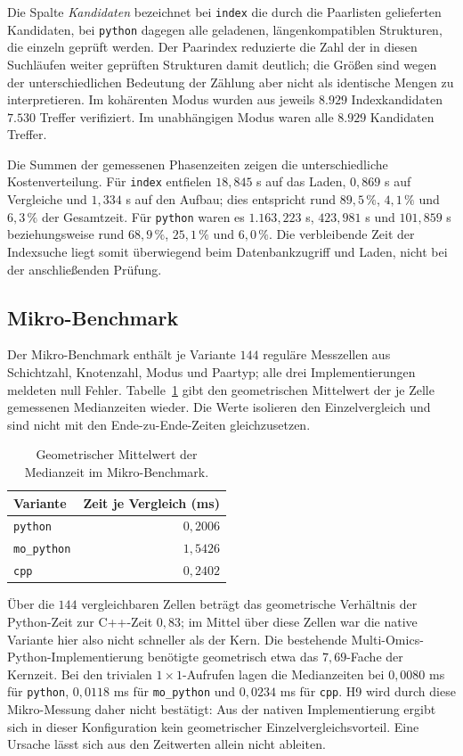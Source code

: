 \documentclass[a4paper,12pt, twoside]{report}
\theoremstyle{definition}
\begin{document}
Die Spalte \emph{Kandidaten} bezeichnet bei \texttt{index} die durch die Paarlisten gelieferten Kandidaten, bei \texttt{python} dagegen alle geladenen, längenkompatiblen Strukturen, die einzeln geprüft werden. Der Paarindex reduzierte die Zahl der in diesen Suchläufen weiter geprüften Strukturen damit deutlich; die Größen sind wegen der unterschiedlichen Bedeutung der Zählung aber nicht als identische Mengen zu interpretieren. Im kohärenten Modus wurden aus jeweils $8.929$ Indexkandidaten $7.530$ Treffer verifiziert. Im unabhängigen Modus waren alle $8.929$ Kandidaten Treffer.

Die Summen der gemessenen Phasenzeiten zeigen die unterschiedliche Kostenverteilung. Für \texttt{index} entfielen $18{,}845$ s auf das Laden, $0{,}869$ s auf Vergleiche und $1{,}334$ s auf den Aufbau; dies entspricht rund $89{,}5\,\%$, $4{,}1\,\%$ und $6{,}3\,\%$ der Gesamtzeit. Für \texttt{python} waren es $1.163{,}223$ s, $423{,}981$ s und $101{,}859$ s beziehungsweise rund $68{,}9\,\%$, $25{,}1\,\%$ und $6{,}0\,\%$. Die verbleibende Zeit der Indexsuche liegt somit überwiegend beim Datenbankzugriff und Laden, nicht bei der anschließenden Prüfung.

\subsection{Mikro-Benchmark}

Der Mikro-Benchmark enthält je Variante $144$ reguläre Messzellen aus Schichtzahl, Knotenzahl, Modus und Paartyp; alle drei Implementierungen meldeten null Fehler. Tabelle~\ref{tab:ucx_micro_results} gibt den geometrischen Mittelwert der je Zelle gemessenen Medianzeiten wieder. Die Werte isolieren den Einzelvergleich und sind nicht mit den Ende-zu-Ende-Zeiten gleichzusetzen.

\begin{table}[!ht]
	\centering
	\small
	\caption{Geometrischer Mittelwert der Medianzeit im Mikro-Benchmark.}
	\label{tab:ucx_micro_results}
	\begin{tabular}{lr}
		\toprule
		Variante & Zeit je Vergleich (ms) \\
		\midrule
		\texttt{python} & $0{,}2006$ \\
		\texttt{mo\_python} & $1{,}5426$ \\
		\texttt{cpp} & $0{,}2402$ \\
		\bottomrule
	\end{tabular}
\end{table}

Über die $144$ vergleichbaren Zellen beträgt das geometrische Verhältnis der Python-Zeit zur C++-Zeit $0{,}83$; im Mittel über diese Zellen war die native Variante hier also nicht schneller als der Kern. Die bestehende Multi-Omics-Python-Implementierung benötigte geometrisch etwa das $7{,}69$-Fache der Kernzeit. Bei den trivialen $1\times1$-Aufrufen lagen die Medianzeiten bei $0{,}0080$ ms für \texttt{python}, $0{,}0118$ ms für \texttt{mo\_python} und $0{,}0234$ ms für \texttt{cpp}. H9 wird durch diese Mikro-Messung daher nicht bestätigt: Aus der nativen Implementierung ergibt sich in dieser Konfiguration kein geometrischer Einzelvergleichsvorteil. Eine Ursache lässt sich aus den Zeitwerten allein nicht ableiten.
\end{document}
